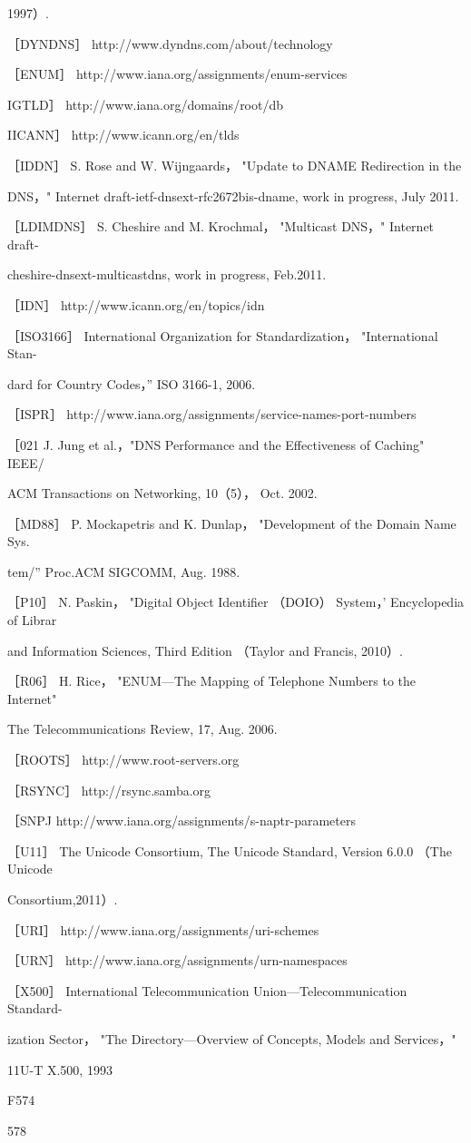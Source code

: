1997）.

［DYNDNS］ http://www.dyndns.com/about/technology

［ENUM］ http://www.iana.org/assignments/enum-services

IGTLD］ http://www.iana.org/domains/root/db

IICANN］ http://www.icann.org/en/tlds

［IDDN］ S. Rose and W. Wijngaards， "Update to DNAME Redirection in the

DNS，" Internet draft-ietf-dnsext-rfc2672bis-dname, work in progress, July 2011.

［LDIMDNS］ S. Cheshire and M. Krochmal， "Multicast DNS，" Internet draft-

cheshire-dnsext-multicastdns, work in progress, Feb.2011.

［IDN］ http://www.icann.org/en/topics/idn

［ISO3166］ International Organization for Standardization， "International Stan-

dard for Country Codes，” ISO 3166-1, 2006.

［ISPR］ http://www.iana.org/assignments/service-names-port-numbers

［021 J. Jung et al.，"DNS Performance and the Effectiveness of Caching" IEEE/

ACM Transactions on Networking, 10（5）， Oct. 2002.

［MD88］ P. Mockapetris and K. Dunlap， "Development of the Domain Name Sys.

tem/” Proc.ACM SIGCOMM, Aug. 1988.

［P10］ N. Paskin， "Digital Object Identifier （DOIO） System，' Encyclopedia of Librar

and Information Sciences, Third Edition （Taylor and Francis, 2010）.

［R06］ H. Rice， "ENUM—The Mapping of Telephone Numbers to the Internet"

The Telecommunications Review, 17, Aug. 2006.

［ROOTS］ http://www.root-servers.org

［RSYNC］ http://rsync.samba.org

［SNPJ http://www.iana.org/assignments/s-naptr-parameters

［U11］ The Unicode Consortium, The Unicode Standard, Version 6.0.0 （The Unicode

Consortium,2011）.

［URI］ http://www.iana.org/assignments/uri-schemes

［URN］ http://www.iana.org/assignments/urn-namespaces

［X500］ International Telecommunication Union—Telecommunication Standard-

ization Sector， "The Directory—Overview of Concepts, Models and Services，"

11U-T X.500, 1993

F574

578